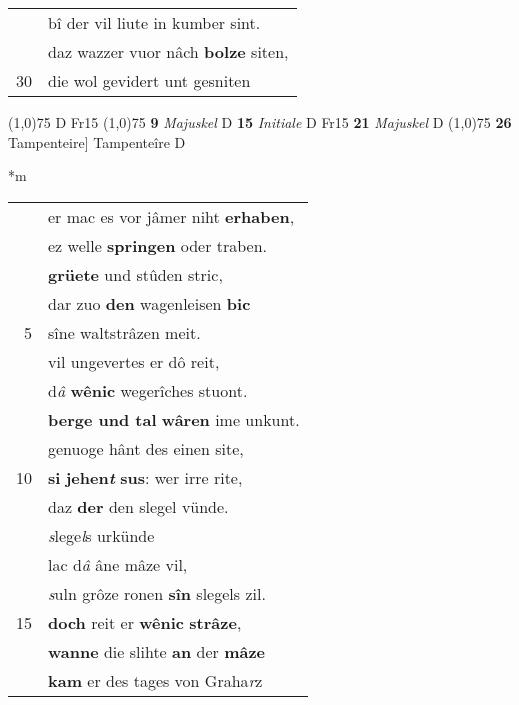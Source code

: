 \documentclass[8pt,a4paper,notitlepage]{article}
\begin{document}
\begin{table}[ht]
\begin{minipage}[t]{0.5\linewidth}
\begin{tabular}{rl}
 & bî der vil liute in kumber sint.\\ 
 & daz wazzer vuor nâch \textbf{bolze} siten,\\ 
30 & die wol gevidert unt gesniten\\ 
\end{tabular}
\scriptsize
\line(1,0){75} \newline
D Fr15 \newline
\line(1,0){75} \newline
\textbf{9} \textit{Majuskel} D  \textbf{15} \textit{Initiale} D Fr15  \textbf{21} \textit{Majuskel} D  \newline
\line(1,0){75} \newline
\textbf{26} Tampenteire] Tampenteîre D \newline
\end{minipage}
\hspace{0.5cm}
\begin{minipage}[t]{0.5\linewidth}
\small
\begin{center}*m
\end{center}
\begin{tabular}{rl}
 & er mac es vor jâmer niht \textbf{erhaben},\\ 
 & ez welle \textbf{springen} oder traben.\\ 
 & \textbf{grüete} und stûden stric,\\ 
 & dar zuo \textbf{den} wagenleisen \textbf{bic}\\ 
5 & sîne waltstrâzen meit.\\ 
 & vil ungevertes er dô reit,\\ 
 & d\textit{â} \textbf{wênic} wegerîches stuont.\\ 
 & \textbf{berge und tal} \textbf{wâren} ime unkunt.\\ 
 & genuoge hânt des einen site,\\ 
10 & \textbf{si} \textbf{jehen\textit{t}} \textbf{sus}: wer irre rite,\\ 
 & daz \textbf{der} den slegel vünde.\\ 
 & \textit{s}lege\textit{l}s urkünde\\ 
 & lac d\textit{â} âne mâze vil,\\ 
 & \textit{s}uln grôze ronen \textbf{sîn} slegels zil.\\ 
15 & \textbf{doch} reit er \textbf{wênic} \textbf{strâze},\\ 
 & \textbf{wanne} die slihte \textbf{an} der \textbf{mâze}\\ 
 & \textbf{kam} er des tages von Graha\textit{r}z\\ 

\end{tabular}
\end{minipage}
\end{table}
\end{document}
